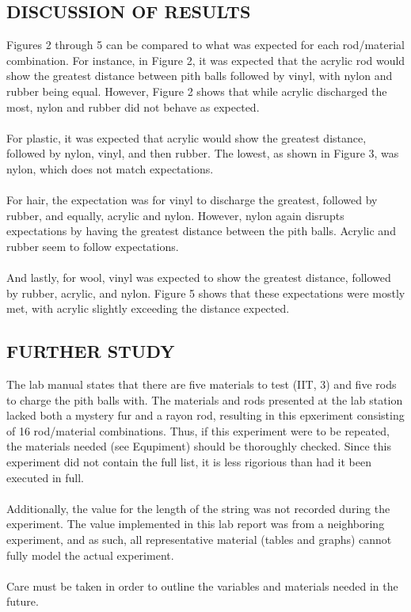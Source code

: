 \documentclass [12pt, letterpaper, twoside] {article}
\begin{document}
\subsection* {DISCUSSION OF RESULTS}
Figures 2 through 5 can be compared to what was expected for each rod/material combination. For instance, in Figure 2, it was expected that the acrylic rod would show the greatest distance between pith balls followed by vinyl, with nylon and rubber being equal. However, Figure 2 shows that while acrylic discharged the most, nylon and rubber did not behave as expected. \\\\
For plastic, it was expected that acrylic would show the greatest distance, followed by nylon, vinyl, and then rubber. The lowest, as shown in Figure 3, was nylon, which does not match expectations. \\\\
For hair, the expectation was for vinyl to discharge the greatest, followed by rubber, and equally, acrylic and nylon. However, nylon again disrupts expectations by having the greatest distance between the pith balls. Acrylic and rubber seem to follow expectations. \\\\
And lastly, for wool, vinyl was expected to show the greatest distance, followed by rubber, acrylic, and nylon. Figure 5 shows that these expectations were mostly met, with acrylic slightly exceeding the distance expected. \\

\subsection* {FURTHER STUDY}
The lab manual states that there are five materials to test (IIT, 3) and five rods to charge the pith balls with. The materials and rods presented at the lab station lacked both a mystery fur and a rayon rod, resulting in this epxeriment consisting of 16 rod/material combinations. Thus, if this experiment were to be repeated, the materials needed (see Equpiment) should be thoroughly checked. Since this experiment did not contain the full list, it is less rigorious than had it been executed in full. \\\\
Additionally, the value for the length of the string was not recorded during the experiment. The value implemented in this lab report was from a neighboring experiment, and as such, all representative material (tables and graphs) cannot fully model the actual experiment. \\\\
Care must be taken in order to outline the variables and materials needed in the future. 
\end{document}
